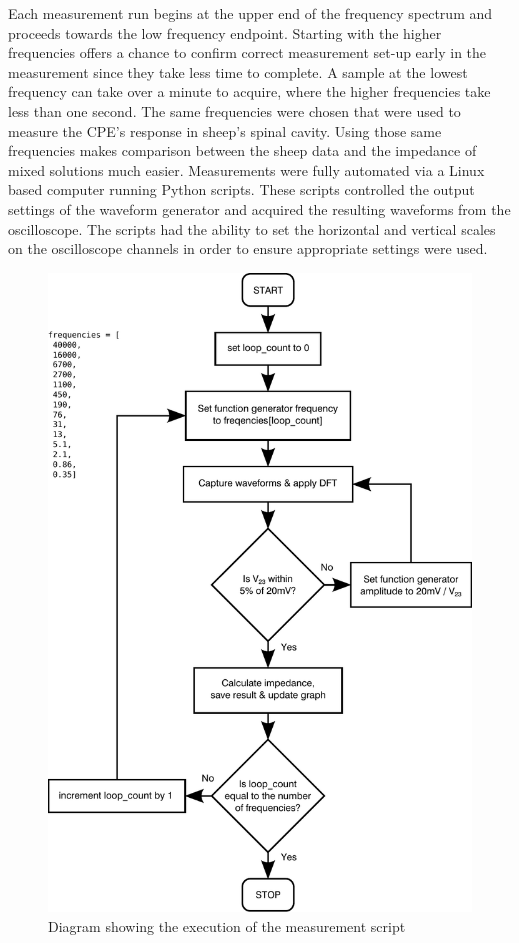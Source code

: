   Each measurement run begins at the upper end of the frequency spectrum and proceeds towards the low frequency endpoint.
  Starting with the higher frequencies offers a chance to confirm correct measurement set-up early in the measurement since they take less time to complete.
  A sample at the lowest frequency can take over a minute to acquire, where the higher frequencies take less than one second.
  The same frequencies were chosen that were used to measure the CPE's response in sheep's spinal cavity.
  Using those same frequencies makes comparison between the sheep data and the impedance of mixed solutions much easier.
  Measurements were fully automated via a Linux based computer running Python scripts.
  These scripts controlled the output settings of the waveform generator and acquired the resulting waveforms from the oscilloscope.
  The scripts had the ability to set the horizontal and vertical scales on the oscilloscope channels in order to ensure appropriate settings were used.
  \begin{figure}
      \centering
      \includegraphics[width=\textwidth]{content/pt2/graphics/measurementFlowchart}
      \caption{\label{fig:creatingCSF_pythonFlowchart}Diagram showing the execution of the measurement script}
  \end{figure}
